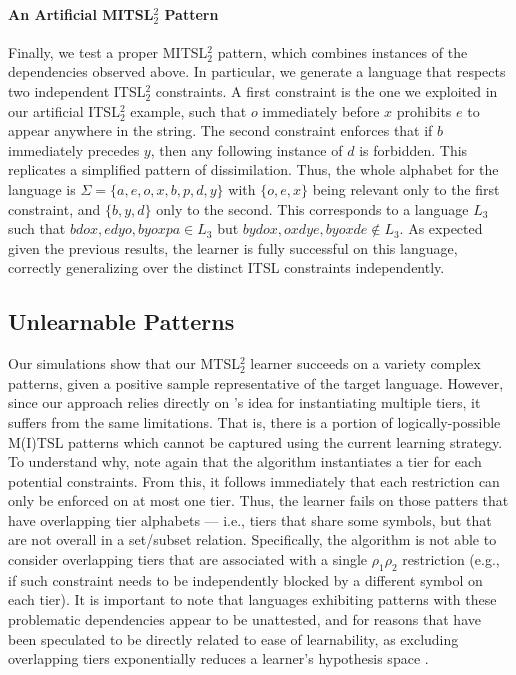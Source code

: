 \documentclass[11pt,a4paper]{article}
\begin{document}
\paragraph{An Artificial MITSL$^2_2$ Pattern}
Finally, we test a proper MITSL$^2_2$ pattern, which combines instances of the dependencies observed above.
In particular, we generate a language that respects two independent  ITSL$^2_2$ constraints. 
A first constraint is the one we exploited in our artificial  ITSL$^2_2$ example, such that $o$ immediately before $x$ prohibits $e$ to appear anywhere in the string.
The second constraint enforces that if $b$ immediately precedes $y$, then any following instance of $d$ is forbidden.
This replicates a simplified pattern of dissimilation.
Thus, the whole alphabet for the language is $\Sigma = \{a, e, o, x, b, p, d, y\}$ with  $ \{o, e, x\}$ being relevant only to the first constraint, and $ \{b, y, d\}$ only to the second.
This corresponds to a language $L_3$ such that $bdox,edyo,byoxpa \in L_3$ but $bydox,oxdye,byoxde \notin L_3$.
As expected given the previous results, the learner is fully successful on this language, correctly generalizing over the distinct ITSL constraints independently.

\subsection{Unlearnable Patterns}
\label{ssec:limits}

Our simulations show that our MTSL$^2_2$  learner succeeds on a variety complex patterns, given a positive sample representative of the target language.
However, since our approach relies directly on  \citet{McMullinSCIL2019}'s idea for instantiating multiple tiers, it suffers from the same limitations.
That is,  there is a portion of logically-possible M(I)TSL patterns which cannot be captured using the current learning strategy.
To understand why, note again that the algorithm instantiates a tier for each potential constraints.
From this, it follows immediately that  each restriction can only be enforced on at most one tier. 
Thus, the learner fails on those patters that have overlapping tier alphabets --- i.e., tiers that share some symbols, but that are not overall in a set/subset relation.
Specifically, the algorithm is not able to consider overlapping tiers that are associated with a single \text{*}$\rho_1\rho_2$ restriction (e.g., if such constraint needs to be independently blocked by a different symbol on each tier).
It is important to note that languages exhibiting patterns with these problematic dependencies appear to be unattested, and for reasons that have been speculated to be directly related to ease of learnability, as excluding overlapping tiers exponentially reduces a learner's hypothesis space \citep{aksenova2018formal}.
\end{document}
